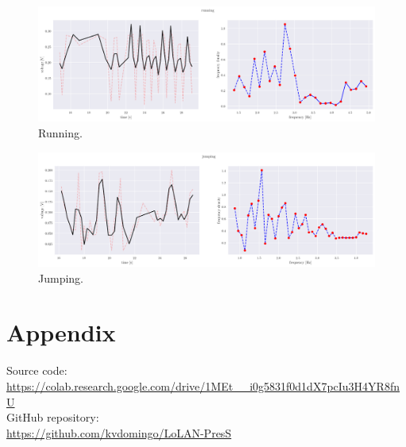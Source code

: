 \documentclass[12pt,a4paper,twoside]{article}
\begin{document}
\begin{figure}[h!]
	\centering
	\includegraphics[width=\linewidth]{running.png}
	\caption{Running.}
	\label{fig:Running}
\end{figure}

\begin{figure}[h!]
	\centering
	\includegraphics[width=\linewidth]{jumping.png}
	\caption{Jumping.}
	\label{fig:jumping}
\end{figure}

\clearpage

\section*{Appendix}
Source code: \\
\url{https://colab.research.google.com/drive/1MEt__i0g5831f0d1dX7pcIu3H4YR8fnU} \\

\noindent
GitHub repository: \\
\url{https://github.com/kvdomingo/LoLAN-PresS}

%
%


%
\end{document}
